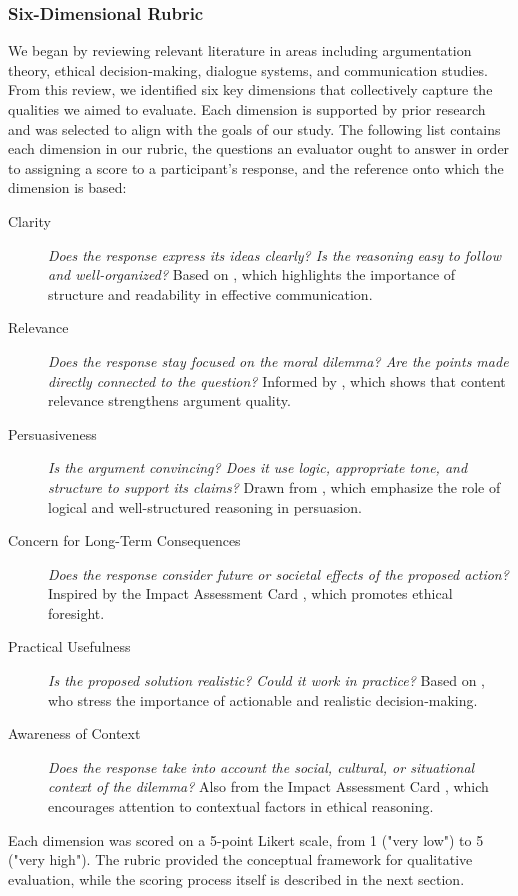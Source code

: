 \subsubsection{Six-Dimensional Rubric}
\label{sec:rubric}

We began by reviewing relevant literature in areas including argumentation theory, ethical decision-making, dialogue systems, and communication studies. From this review, we identified six key dimensions that collectively capture the qualities we aimed to evaluate. Each dimension is supported by prior research and was selected to align with the goals of our study.
The following list contains each dimension in our rubric, the questions an evaluator ought to answer in order to assigning a score to a participant's response, and the reference onto which the dimension is based:

\begin{description}
  \item[Clarity] \textit{Does the response express its ideas clearly? Is the reasoning easy to follow and well-organized?}
    Based on \citet{mctear2005spoken}, which highlights the importance of structure and readability in effective communication.
  \item[Relevance] \textit{Does the response stay focused on the moral dilemma? Are the points made directly connected to the question?}
    Informed by \citet{habernal2016argument}, which shows that content relevance strengthens argument quality.
  \item[Persuasiveness] \textit{Is the argument convincing? Does it use logic, appropriate tone, and structure to support its claims?}
    Drawn from \citet{johnson2006logical}, which emphasize the role of logical and well-structured reasoning in persuasion.
  \item[Concern for Long-Term Consequences] \textit{Does the response consider future or societal effects of the proposed action?}
    Inspired by the Impact Assessment Card \citep{impactassessment2018cscw}, which promotes ethical foresight.
  \item[Practical Usefulness] \textit{Is the proposed solution realistic? Could it work in practice?}
    Based on \citet{bazerman2012judgment}, who stress the importance of actionable and realistic decision-making.
  \item[Awareness of Context] \textit{Does the response take into account the social, cultural, or situational context of the dilemma?}
    Also from the Impact Assessment Card \citep{impactassessment2018cscw}, which encourages attention to contextual factors in ethical reasoning.
\end{description}

Each dimension was scored on a 5-point Likert scale, from 1 ("very low") to 5 ("very high"). The rubric provided the conceptual framework for qualitative evaluation, while the scoring process itself is described in the next section.
